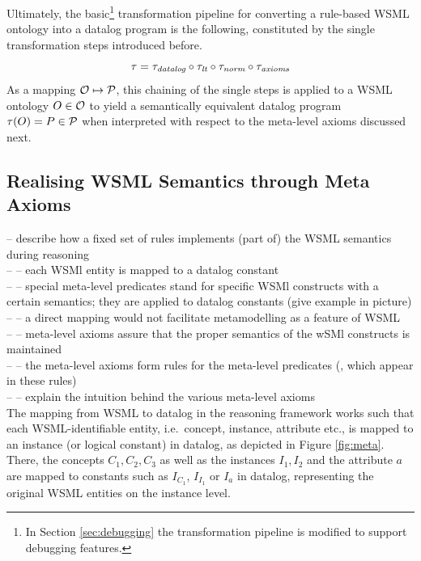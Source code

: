\bigskip

Ultimately, the basic\footnote{In Section \ref{sec:debugging} the
transformation pipeline is modified to support debugging
features.} transformation pipeline for converting a rule-based
WSML ontology into a datalog program is the following, constituted
by the single transformation steps introduced before.
\begin{displaymath}
    \tau = \transdlog \circ \translt \circ \transnorm \circ \transax
\end{displaymath}
As a mapping $\O \mapsto \P$, this chaining of the single steps is
applied to a WSML ontology $O \in \O$ to yield a semantically
equivalent datalog program $\tau (O) = P \in \P$ when interpreted
with respect to the meta-level axioms discussed next.



\subsection{Realising WSML Semantics through Meta Axioms}
-- describe how a fixed set of rules implements (part of) the WSML semantics during reasoning \\
-- -- each WSMl entity is mapped to a datalog constant \\
-- -- special meta-level predicates stand for specific WSMl constructs with a certain semantics; they are applied to datalog constants (give example in picture) \\
-- -- a direct mapping would not facilitate metamodelling as a feature of WSML \\
-- -- meta-level axioms assure that the proper semantics of the wSMl constructs is maintained \\
-- -- the meta-level axioms form rules for the meta-level predicates (, which appear in these rules) \\
-- -- explain the intuition behind the various meta-level axioms \\

The mapping from WSML to datalog in the reasoning framework works
such that each WSML-identifiable entity, i.e.\ concept, instance,
attribute etc., is mapped to an instance (or logical constant) in
datalog, as depicted in Figure \ref{fig:meta}. There, the concepts
$C_1, C_2, C_3$ as well as the instances $I_1, I_2$ and the
attribute $a$ are mapped to constants such as $I_{C_1}$, $I_{I_1}$
or $I_a$ in datalog, representing the original WSML entities on
the instance level.

